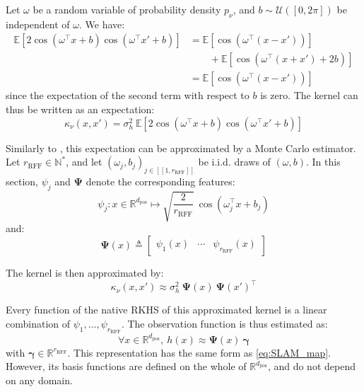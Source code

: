 Let $\omega$ be a random variable of probability density $p_\nu$, and $b\sim\mathcal{U}([0,2\pi])$ be independent of $\omega$. We have:
\begin{equation}
	\begin{aligned}
	\mathbb{E}\left[2\cos\left(\omega^\top x+b\right)\cos\left(\omega^\top x'+b\right)\right]&=\mathbb{E}\left[\cos\left(\omega^\top(x-x')\right)\right]\\
	&\qquad+\mathbb{E}\left[\cos\left(\omega^\top(x+x')+2b\right)\right]\\
	&=\mathbb{E}\left[\cos\left(\omega^\top(x-x')\right)\right]
	\end{aligned}
\end{equation}
since the expectation of the second term with respect to $b$ is zero. The kernel can thus be written as an expectation:
\begin{equation}
	\kappa_\nu(x,x')=\sigma_h^2\:\mathbb{E}\left[2\cos\left(\omega^\top x+b\right)\cos\left(\omega^\top x'+b\right)\right]
\end{equation}

Similarly to , this expectation can be approximated by a Monte Carlo estimator. Let $r_{\mathrm{RFF}}\in\mathbb{N}^*$, and let $(\omega_j,b_j)_{j\in[\![1,r_{\mathrm{RFF}}]\!]}$ be i.i.d. draws of $(\omega,b)$. In this section, $\psi_j$ and $\boldsymbol{\Psi}$ denote the corresponding features:
\begin{equation}
	\psi_j:x\in\mathbb{R}^{d_{\mathrm{pos}}}\mapsto\sqrt{\frac{2}{r_{\mathrm{RFF}}}}\:\cos\left(\omega_j^\top x+b_j\right)
\end{equation}
and:
\begin{equation}
	\boldsymbol{\Psi}(x)\triangleq\begin{bmatrix}
	\psi_1(x)&\cdots&\psi_{r_{\mathrm{RFF}}}(x)
	\end{bmatrix}
\end{equation}

The kernel is then approximated by:
\begin{equation}
	\kappa_\nu(x,x')\approx\sigma_h^2\:\boldsymbol{\Psi}(x)\:\boldsymbol{\Psi}(x')^\top
\end{equation}

Every function of the native RKHS of this approximated kernel is a linear combination of $\psi_1,\dots,\psi_{r_{\mathrm{RFF}}}$. The observation function is thus estimated as:
\begin{equation}
	\forall x\in\mathbb{R}^{d_{\mathrm{pos}}},\:h(x)\approx\boldsymbol{\Psi}(x)\:\boldsymbol{\gamma}\label{eq:RFF_map}
\end{equation}
with $\boldsymbol{\gamma}\in\mathbb{R}^{r_{\mathrm{RFF}}}$. This representation has the same form as \eqref{eq:SLAM_map}. However, its basis functions are defined on the whole of $\mathbb{R}^{d_{\mathrm{pos}}}$, and do not depend on any domain.

